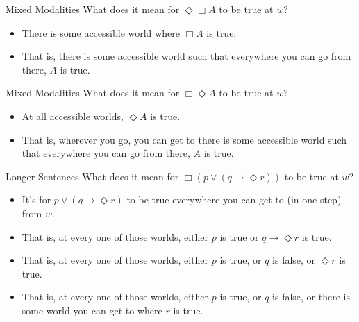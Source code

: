 \documentclass[
  ignorenonframetext,
]{beamer}
\providecommand{\tightlist}{%
  \setlength{\itemsep}{0pt}\setlength{\parskip}{0pt}}
\renewcommand{\,}{\text{, }}
\begin{document}
\begin{frame}{Mixed Modalities}
\protect\hypertarget{mixed-modalities}{}
What does it mean for \(\Diamond \Box A\) to be true at \(w\)?\pause

\begin{itemize}
\tightlist
\item
  There is some accessible world where \(\Box A\) is true.\pause
\item
  That is, there is some accessible world such that everywhere you can
  go from there, \(A\) is true.
\end{itemize}
\end{frame}

\begin{frame}{Mixed Modalities}
\protect\hypertarget{mixed-modalities-1}{}
What does it mean for \(\Box \Diamond A\) to be true at \(w\)?\pause

\begin{itemize}
\tightlist
\item
  At all accessible worlds, \(\Diamond A\) is true.\pause
\item
  That is, wherever you go, you can get to there is some accessible
  world such that everywhere you can go from there, \(A\) is true.
\end{itemize}
\end{frame}

\begin{frame}{Longer Sentences}
\protect\hypertarget{longer-sentences}{}
What does it mean for \(\Box(p \vee (q \rightarrow \Diamond r))\) to be
true at \(w\)? \pause

\begin{itemize}
\tightlist
\item
  It's for \(p \vee (q \rightarrow \Diamond r)\) to be true everywhere
  you can get to (in one step) from \(w\).
\item
  That is, at every one of those worlds, either \(p\) is true or
  \(q \rightarrow \Diamond r\) is true.\pause
\item
  That is, at every one of those worlds, either \(p\) is true, or \(q\)
  is false, or \(\Diamond r\) is true. \pause
\item
  That is, at every one of those worlds, either \(p\) is true, or \(q\)
  is false, or there is some world you can get to where \(r\) is true.
\end{itemize}
\end{frame}
\end{document}
